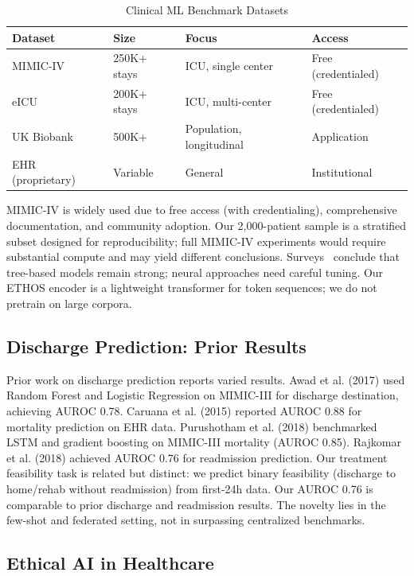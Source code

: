\begin{table}[htbp]
\centering
\caption{Clinical ML Benchmark Datasets}
\small
\begin{tabular}{llll}
\toprule
\textbf{Dataset} & \textbf{Size} & \textbf{Focus} & \textbf{Access} \\
\midrule
MIMIC-IV & 250K+ stays & ICU, single center & Free (credentialed) \\
eICU & 200K+ stays & ICU, multi-center & Free (credentialed) \\
UK Biobank & 500K+ & Population, longitudinal & Application \\
EHR (proprietary) & Variable & General & Institutional \\
\bottomrule
\end{tabular}
\label{tab:benchmark_datasets}
\end{table} MIMIC-IV is widely used due to free access (with credentialing), comprehensive documentation, and community adoption. Our 2,000-patient sample is a stratified subset designed for reproducibility; full MIMIC-IV experiments would require substantial compute and may yield different conclusions. Surveys~\cite{borisov2022deep} conclude that tree-based models remain strong; neural approaches need careful tuning. Our ETHOS encoder is a lightweight transformer for token sequences; we do not pretrain on large corpora.

\subsection{Discharge Prediction: Prior Results}

Prior work on discharge prediction reports varied results. Awad et al. (2017) used Random Forest and Logistic Regression on MIMIC-III for discharge destination, achieving AUROC 0.78. Caruana et al. (2015) reported AUROC 0.88 for mortality prediction on EHR data. Purushotham et al. (2018) benchmarked LSTM and gradient boosting on MIMIC-III mortality (AUROC 0.85). Rajkomar et al. (2018) achieved AUROC 0.76 for readmission prediction. Our treatment feasibility task is related but distinct: we predict binary feasibility (discharge to home/rehab without readmission) from first-24h data. Our AUROC 0.76 is comparable to prior discharge and readmission results. The novelty lies in the few-shot and federated setting, not in surpassing centralized benchmarks.

\subsection{Ethical AI in Healthcare}


